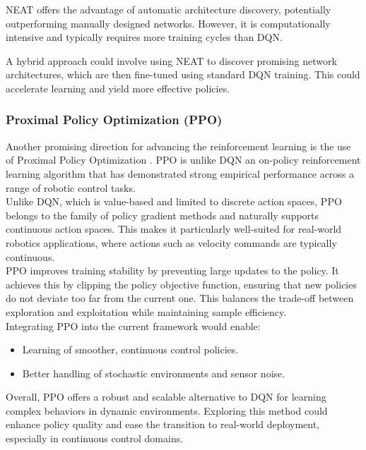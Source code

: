 NEAT offers the advantage of automatic architecture discovery, potentially outperforming manually designed networks. However, it is computationally intensive and typically requires more training cycles than DQN.

A hybrid approach could involve using NEAT to discover promising network architectures, which are then fine-tuned using standard DQN training. This could accelerate learning and yield more effective policies.

\subsubsection{Proximal Policy Optimization (PPO)}
Another promising direction for advancing the reinforcement learning is the use of Proximal Policy Optimization \cite{ppo}. PPO is unlike DQN an on-policy reinforcement learning algorithm that has demonstrated strong empirical performance across a range of robotic control tasks.\\

Unlike DQN, which is value-based and limited to discrete action spaces, PPO belongs to the family of policy gradient methods and naturally supports continuous action spaces. This makes it particularly well-suited for real-world robotics applications, where actions such as velocity commands are typically continuous.\\

PPO improves training stability by preventing large updates to the policy. It achieves this by clipping the policy objective function, ensuring that new policies do not deviate too far from the current one. This balances the trade-off between exploration and exploitation while maintaining sample efficiency.\\

Integrating PPO into the current framework would enable:
\begin{itemize}
  \item Learning of smoother, continuous control policies.
  \item Better handling of stochastic environments and sensor noise.
\end{itemize}

Overall, PPO offers a robust and scalable alternative to DQN for learning complex behaviors in dynamic environments. Exploring this method could enhance policy quality and ease the transition to real-world deployment, especially in continuous control domains.
